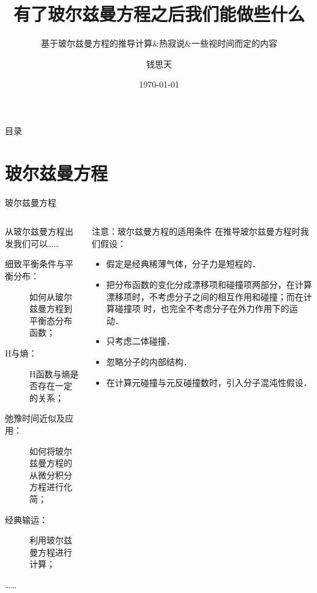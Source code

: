 \documentclass{if-beamer}
\title[平衡态统计物理讨论班]{有了玻尔兹曼方程之后我们能做些什么}
\subtitle{基于玻尔兹曼方程的推导计算\&热寂说\&一些视时间而定的内容}
\author{钱思天}
\institute[PKU]{
  Peking University
}
\date{\today}
\begin{document}
\begin{frame}
  \titlepage
\end{frame}

\begin{frame}{目录}
  \tableofcontents
\end{frame}

\section{玻尔兹曼方程}
\begin{frame}{玻尔兹曼方程}

\begin{columns}

\begin{column}{0.5\textwidth}
    
    \begin{block}{从玻尔兹曼方程出发我们可以……}
        \begin{description}
            \item [细致平衡条件与平衡分布：] 如何从玻尔兹曼方程到平衡态分布函数；
            \item [H与熵：]H函数与熵是否存在一定的关系；
            \item [弛豫时间近似及应用：]如何将玻尔兹曼方程的从微分积分方程进行化简；
            \item [经典输运：]利用玻尔兹曼方程进行计算；
            \item [……]
        \end{description}  
    \end{block}

\end{column}

\begin{column}{0.5\textwidth}
\begin{alertblock}{注意：玻尔兹曼方程的适用条件}
    在推导玻尔兹曼方程时我们假设：
\begin{itemize}
    \item 假定是经典稀薄气体，分子力是短程的．
    \item 把分布函数的变化分成漂移项和碰撞项两部分，在计算
    漂移项时，不考虑分子之间的相互作用和碰撞；而在计算碰撞项
    时，也完全不考虑分子在外力作用下的运动．
    \item 只考虑二体碰撞．
    \item 忽略分子的内部结构．
    \item 在计算元碰撞与元反碰撞数时，引入分子混沌性假设．
\end{itemize}
    
\end{alertblock}
    
\end{column}




\end{columns}
\end{frame}
\end{document}
